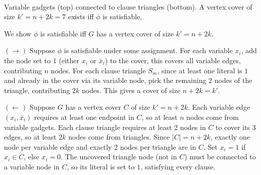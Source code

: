 \documentclass[12pt,a4paper,openany]{article}
\begin{document}
\begin{center}
\\[0.5em]
{\small Variable gadgets (top) connected to clause triangles (bottom). A vertex cover of size $k' = n + 2k = 7$ exists iff $\phi$ is satisfiable.}
\end{center}

We show $\phi$ is satisfiable iff $G$ has a vertex cover of size $k' = n + 2k$.

$(\to)$ Suppose $\phi$ is satisfiable under some assignment. For each variable $x_i$, add the
node set to $1$ (either $x_i$ or $\bar{x}_i$) to the cover, this covers all variable edges,
contributing $n$ nodes. For each clause triangle $S_m$, since at least one literal is $1$ and
already in the cover via its variable node, pick the remaining 2 nodes of the triangle, 
contributing $2k$ nodes. This gives a cover of size $n + 2k = k'$.

$(\leftarrow)$ Suppose $G$ has a vertex cover $C$ of size $k'= n + 2k$. Each variable edge
$(x_i, \bar{x}_i)$ requires at least one endpoint in $C$, so at least $n$ nodes come from variable
gadgets. Each clause triangle requires at least 2 nodes in $C$ to cover its 3 edges, so at
least $2k$ nodes come from triangles. Since $|C| = n + 2k$, exactly one node per variable
edge and exactly 2 nodes per triangle are in $C$. Set $x_i = 1$ if $x_i \in C$, else $x_i = 0$.
The uncovered triangle node (not in $C$) must be connected to a variable node in $C$, so its
literal is set to $1$, satisfying every clause.
\end{document}

